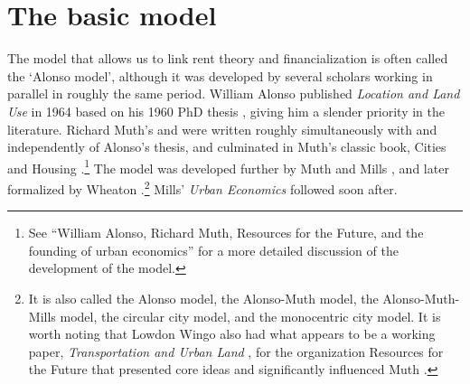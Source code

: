\section{The basic model}


The model that allows us to link rent theory and financialization %
is often called the `Alonso model', although it was developed by several scholars working in parallel in roughly the same period. William Alonso published \textit{Location and Land Use} in 1964  \cite{alonsoLocationLandUse1964} based on his 1960 PhD thesis \cite{alonsoModelUrbanLand1960},  
giving him a slender priority in the literature. 
Richard Muth's \cite{muthSpatialStructureHousing1961} and \cite{muthRationalExpectationsTheory1961} were written roughly simultaneously with and independently of Alonso's thesis, and culminated in Muth's classic book, Cities and Housing \cite{muthCitiesHousingSpatial1969}.\footnote{See ``William Alonso, Richard Muth, Resources for the Future, and the founding of urban economics''\cite{mcdonaldWilliamAlonsoRichard2007} for a more detailed discussion of the development of the model.}  %
 The model was developed further by Muth \cite{muthCitiesHousingSpatial1969} and Mills \cite{millsAggregativeModelResource1967}, and later formalized by Wheaton \cite{wheatonComparativeStaticAnalysis1974}.\footnote{It is also called the Alonso model, the Alonso-Muth model, the Alonso-Muth-Mills model, the circular city model, and the monocentric city model. %
It is worth noting that Lowdon Wingo also had what appears to be a working paper, \textit{Transportation and Urban Land} \cite{wingoTransportationUrbanLand1961}, for the organization Resources for the Future %
that presented core ideas and significantly influenced Muth \cite{mcdonaldWilliamAlonsoRichard2007}.} Mills' \textit{Urban Economics} \cite{millsUrbanEconomics1972} followed soon after. 

